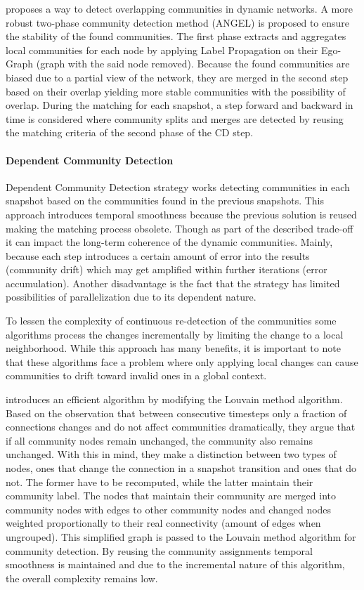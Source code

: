 \documentclass[
acmsmall,
nonacm,
screen,
acmthm]{../../scripts/pandoc/templates/acmart}
\begin{document}
\citet{rossettiANGELEfficientEffective2020} proposes a way to detect
overlapping communities in dynamic networks. A more robust two-phase
community detection method (ANGEL) is proposed to ensure the stability
of the found communities. The first phase extracts and aggregates local
communities for each node by applying Label Propagation on their
Ego-Graph (graph with the said node removed). Because the found
communities are biased due to a partial view of the network, they are
merged in the second step based on their overlap yielding more stable
communities with the possibility of overlap. During the matching for
each snapshot, a step forward and backward in time is considered where
community splits and merges are detected by reusing the matching
criteria of the second phase of the CD step.

\hypertarget{dependent-community-detection}{%
\paragraph{Dependent Community
Detection}\label{dependent-community-detection}}

Dependent Community Detection strategy works detecting communities in
each snapshot based on the communities found in the previous snapshots.
This approach introduces temporal smoothness because the previous
solution is reused making the matching process obsolete. Though as part
of the described trade-off it can impact the long-term coherence of the
dynamic communities. Mainly, because each step introduces a certain
amount of error into the results (community drift) which may get
amplified within further iterations (error accumulation). Another
disadvantage is the fact that the strategy has limited possibilities of
parallelization due to its dependent nature.

To lessen the complexity of continuous re-detection of the communities
some algorithms process the changes incrementally by limiting the change
to a local neighborhood. While this approach has many benefits, it is
important to note that these algorithms face a problem where only
applying local changes can cause communities to drift toward invalid
ones in a global context.

\citet{heFastAlgorithmCommunity2015} introduces an efficient algorithm
by modifying the Louvain method algorithm. Based on the observation that
between consecutive timesteps only a fraction of connections changes and
do not affect communities dramatically, they argue that if all community
nodes remain unchanged, the community also remains unchanged. With this
in mind, they make a distinction between two types of nodes, ones that
change the connection in a snapshot transition and ones that do not. The
former have to be recomputed, while the latter maintain their community
label. The nodes that maintain their community are merged into community
nodes with edges to other community nodes and changed nodes weighted
proportionally to their real connectivity (amount of edges when
ungrouped). This simplified graph is passed to the Louvain method
algorithm for community detection. By reusing the community assignments
temporal smoothness is maintained and due to the incremental nature of
this algorithm, the overall complexity remains low.
\end{document}
